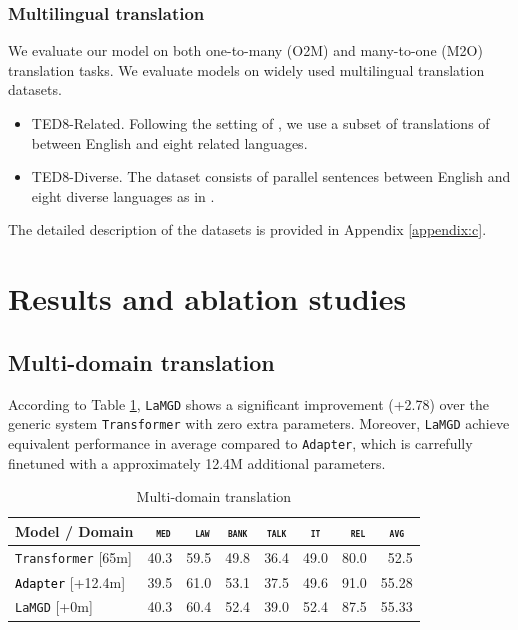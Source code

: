 \documentclass[11pt]{article}
\newcommand{\revision}[1]{\textcolor{black}{#1}}
\newcommand{\domain}[1]{\texttt{\textsc{#1}}}
\newcommand{\system}[1]{\texttt{{#1}}}
\begin{document}
\subsubsection{Multilingual translation}
We evaluate our model on both one-to-many (O2M) and many-to-one (M2O)
translation tasks. We evaluate models on widely used multilingual translation datasets.
\begin{itemize}
	\item TED8-Related. Following the setting of \citet{Wang20balancing}, we use a subset of translations of \citet{qi18when} between English and eight related languages.
	\item TED8-Diverse. The dataset consists of parallel sentences between English and eight diverse languages as in \citet{Wang20balancing}.
\end{itemize}
The detailed description of the datasets is provided in Appendix \ref{appendix:c}.
\section{Results and ablation studies}
\subsection{Multi-domain translation}
According to Table \ref{tab:mdmt}, \system{LaMGD} shows a significant improvement (+2.78) over the generic system \system{Transformer} with zero extra parameters. Moreover, \system{LaMGD} achieve equivalent performance in average compared to \system{Adapter}, which is carrefully finetuned with a approximately 12.4M additional parameters.
\begin{table}[h!]
  \centering
  \begin{tabular}{|p{4cm}|*{7}{r|}} \hline
    Model / Domain & \multicolumn{1}{c|}{\domain{ med}} & \multicolumn{1}{c|}{\domain{ law}} & \multicolumn{1}{c|}{\domain{bank}} & \multicolumn{1}{c|}{\domain{talk}} & \multicolumn{1}{c|}{\domain{ it }} & \multicolumn{1}{c|}{\domain{ rel}} & \multicolumn{1}{c|}{\domain{avg}} \\ \hline 
    \system{Transformer}  \hfill{\footnotesize[65m]} & 40.3 & 59.5 & 49.8 & 36.4 & 49.0 & 80.0  & 52.5\\
    \revision{\system{Adapter}}   \hfill{\footnotesize[+12.4m]}  & 39.5 & 61.0 & 53.1 & 37.5 & 49.6 & 91.0 & 55.28 \\ 
    \system{LaMGD}   \hfill{\footnotesize[+0m]}  & 40.3 & 60.4 & 52.4 & 39.0 & 52.4 & 87.5 & 55.33 \\ 
    \hline
  \end{tabular}
  \caption{Multi-domain translation}
  \label{tab:mdmt}
\end{table}
\end{document}
